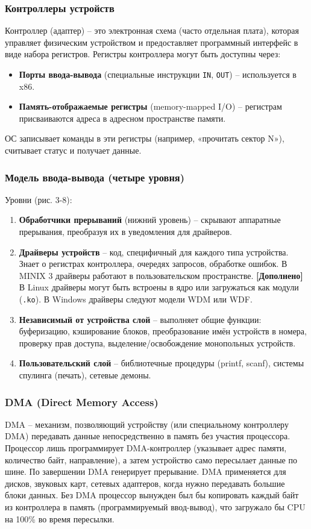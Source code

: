 \documentclass[a4paper,12pt]{article}
\begin{document}
\subsubsection{Контроллеры устройств}
Контроллер (адаптер) – это электронная схема (часто отдельная плата), которая управляет физическим устройством и предоставляет программный интерфейс в виде набора регистров. Регистры контроллера могут быть доступны через:
\begin{itemize}
    \item \textbf{Порты ввода-вывода} (специальные инструкции \texttt{IN}, \texttt{OUT}) – используется в x86.
    \item \textbf{Память-отображаемые регистры} (memory-mapped I/O) – регистрам присваиваются адреса в адресном пространстве памяти.
\end{itemize}
ОС записывает команды в эти регистры (например, «прочитать сектор N»), считывает статус и получает данные.

\subsubsection{Модель ввода-вывода (четыре уровня)}
Уровни (рис. 3-8):
\begin{enumerate}
    \item \textbf{Обработчики прерываний} (нижний уровень) – скрывают аппаратные прерывания, преобразуя их в уведомления для драйверов.
    \item \textbf{Драйверы устройств} – код, специфичный для каждого типа устройства. Знает о регистрах контроллера, очередях запросов, обработке ошибок. В MINIX 3 драйверы работают в пользовательском пространстве. \textbf{[Дополнено]} В Linux драйверы могут быть встроены в ядро или загружаться как модули (\texttt{.ko}). В Windows драйверы следуют модели WDM или WDF.
    \item \textbf{Независимый от устройства слой} – выполняет общие функции: буферизацию, кэширование блоков, преобразование имён устройств в номера, проверку прав доступа, выделение/освобождение монопольных устройств.
    \item \textbf{Пользовательский слой} – библиотечные процедуры (printf, scanf), системы спулинга (печать), сетевые демоны.
\end{enumerate}

\subsubsection{DMA (Direct Memory Access)}
DMA – механизм, позволяющий устройству (или специальному контроллеру DMA) передавать данные непосредственно в память без участия процессора. Процессор лишь программирует DMA-контроллер (указывает адрес памяти, количество байт, направление), а затем устройство само пересылает данные по шине. По завершении DMA генерирует прерывание. DMA применяется для дисков, звуковых карт, сетевых адаптеров, когда нужно передавать большие блоки данных. Без DMA процессор вынужден был бы копировать каждый байт из контроллера в память (программируемый ввод-вывод), что загружало бы CPU на 100\% во время пересылки.
\end{document}
